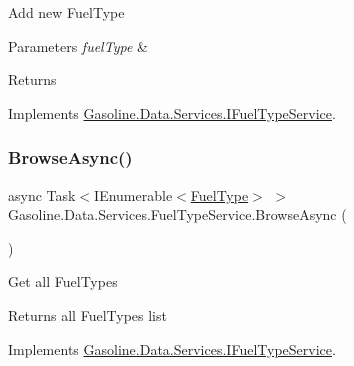 Add new Fuel\+Type 


\begin{DoxyParams}{Parameters}
{\em fuel\+Type} & \\
\hline
\end{DoxyParams}
\begin{DoxyReturn}{Returns}

\end{DoxyReturn}


Implements \mbox{\hyperlink{interface_gasoline_1_1_data_1_1_services_1_1_i_fuel_type_service_aca2418fb4b12a5d3b0663cc01647a1fa}{Gasoline.\+Data.\+Services.\+I\+Fuel\+Type\+Service}}.

\mbox{\label{class_gasoline_1_1_data_1_1_services_1_1_fuel_type_service_a8255c7d8d62590890d09b618ef679b41}} 
\subsubsection{\texorpdfstring{BrowseAsync()}{BrowseAsync()}}
{\footnotesize\ttfamily async Task$<$I\+Enumerable$<$\mbox{\hyperlink{class_gasoline_1_1_data_1_1_models_1_1_fuel_type}{Fuel\+Type}}$>$ $>$ Gasoline.\+Data.\+Services.\+Fuel\+Type\+Service.\+Browse\+Async (\begin{DoxyParamCaption}{ }\end{DoxyParamCaption})}



Get all Fuel\+Types 

\begin{DoxyReturn}{Returns}
all Fuel\+Types list
\end{DoxyReturn}


Implements \mbox{\hyperlink{interface_gasoline_1_1_data_1_1_services_1_1_i_fuel_type_service_a7d27b8b4793ab2ac48f24c78d681469b}{Gasoline.\+Data.\+Services.\+I\+Fuel\+Type\+Service}}.

\mbox{\label{class_gasoline_1_1_data_1_1_services_1_1_fuel_type_service_a3aff4edf14e7e4b320268f0383a9209c}} 

